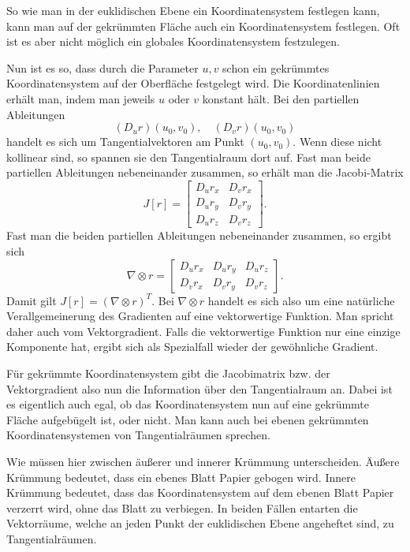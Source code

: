 \documentclass[a4paper,12pt,fleqn]{article}
\begin{document}
So wie man in der euklidischen Ebene ein Koordinatensystem
festlegen kann, kann man auf der gekrümmten Fläche auch
ein Koordinatensystem festlegen. Oft ist es aber nicht möglich
ein globales Koordinatensystem festzulegen.

Nun ist es so, dass durch die Parameter \(u,v\) schon ein
gekrümmtes Koordinatensystem auf der Oberfläche festgelegt wird.
Die Koordinatenlinien erhält man, indem man jeweils \(u\) oder \(v\)
konstant hält. Bei den partiellen Ableitungen
\begin{equation}
(D_u r)(u_0,v_0),\quad (D_v r)(u_0,v_0)
\end{equation}
handelt es sich um Tangentialvektoren am Punkt \((u_0,v_0)\).
Wenn diese nicht kollinear sind, so spannen sie den
Tangentialraum dort auf. Fast man beide partiellen Ableitungen
nebeneinander zusammen, so erhält man die Jacobi-Matrix
\begin{equation}
J[r] = \begin{bmatrix}
D_u r_x & D_v r_x\\
D_u r_y & D_v r_y\\
D_u r_z & D_v r_z
\end{bmatrix}.
\end{equation}
Fast man die beiden partiellen Ableitungen nebeneinander
zusammen, so ergibt sich
\begin{equation}
\nabla\otimes r = \begin{bmatrix}
D_u r_x & D_u r_y & D_u r_z\\
D_v r_x & D_v r_y & D_v r_z
\end{bmatrix}.
\end{equation}
Damit gilt \(J[r]=(\nabla\otimes r)^T\). Bei \(\nabla\otimes r\)
handelt es sich also um eine natürliche Verallgemeinerung
des Gradienten auf eine vektorwertige Funktion. Man spricht
daher auch vom Vektorgradient. Falls die vektorwertige Funktion
nur eine einzige Komponente hat, ergibt sich als Spezialfall
wieder der gewöhnliche Gradient.

Für gekrümmte Koordinatensystem gibt die Jacobimatrix bzw. der
Vektorgradient also nun die Information über den Tangentialraum
an. Dabei ist es eigentlich auch egal, ob das Koordinatensystem nun
auf eine gekrümmte Fläche aufgebügelt ist, oder nicht. Man kann
auch bei ebenen gekrümmten Koordinatensystemen von Tangentialräumen
sprechen.

Wie müssen hier zwischen äußerer und innerer Krümmung unterscheiden.
Äußere Krümmung bedeutet, dass ein ebenes Blatt Papier gebogen
wird. Innere Krümmung bedeutet, dass das Koordinatensystem auf
dem ebenen Blatt Papier verzerrt wird, ohne das Blatt zu verbiegen.
In beiden Fällen entarten die Vektorräume, welche an jeden Punkt
der euklidischen Ebene angeheftet sind, zu Tangentialräumen.
\end{document}
